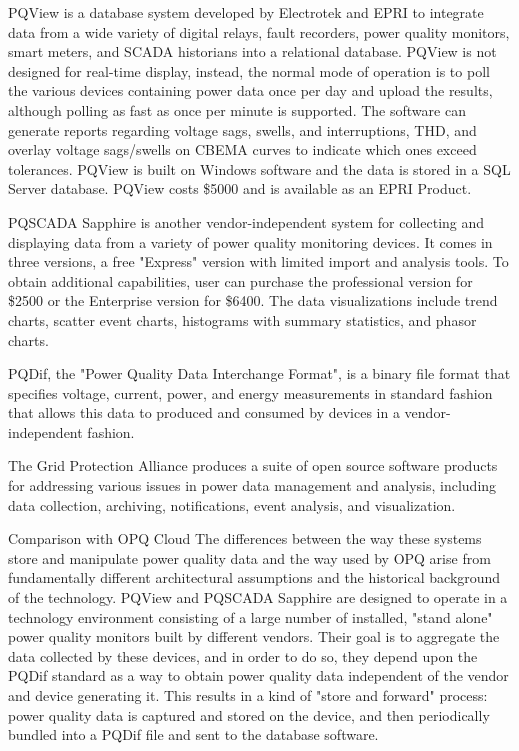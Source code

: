 PQView is a database system developed by Electrotek and EPRI to integrate data from a wide variety of digital relays, fault recorders, power quality monitors, smart meters, and SCADA historians into a relational database. PQView is not designed for real-time display, instead, the normal mode of operation is to poll the various devices containing power data once per day and upload the results, although polling as fast as once per minute is supported. The software can generate reports regarding voltage sags, swells, and interruptions, THD, and overlay voltage sags/swells on CBEMA curves to indicate which ones exceed tolerances. PQView is built on Windows software and the data is stored in a SQL Server database. PQView costs \$5000 and is available as an EPRI Product.

PQSCADA Sapphire is another vendor-independent system for collecting and displaying data from a variety of power quality monitoring devices. It comes in three versions, a free "Express" version with limited import and analysis tools. To obtain additional capabilities, user can purchase the professional version for \$2500 or the Enterprise version for \$6400. The data visualizations include trend charts, scatter event charts, histograms with summary statistics, and phasor charts.

PQDif, the "Power Quality Data Interchange Format", is a binary file format that specifies voltage, current, power, and energy measurements in standard fashion that allows this data to produced and consumed by devices in a vendor-independent fashion.

The Grid Protection Alliance produces a suite of open source software products for addressing various issues in power data management and analysis, including data collection, archiving, notifications, event analysis, and visualization.

Comparison with OPQ Cloud
The differences between the way these systems store and manipulate power quality data and the way used by OPQ arise from fundamentally different architectural assumptions and the historical background of the technology. PQView and PQSCADA Sapphire are designed to operate in a technology environment consisting of a large number of installed, "stand alone" power quality monitors built by different vendors. Their goal is to aggregate the data collected by these devices, and in order to do so, they depend upon the PQDif standard as a way to obtain power quality data independent of the vendor and device generating it. This results in a kind of "store and forward" process: power quality data is captured and stored on the device, and then periodically bundled into a PQDif file and sent to the database software.

